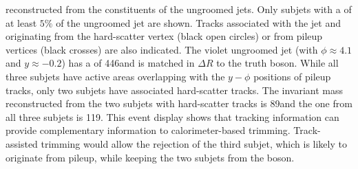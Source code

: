 \documentclass{atlasnote}
\begin{document}
reconstructed from the constituents of the ungroomed jets. Only subjets with a \pT of at least $5\%$ of the ungroomed jet \pT are shown. 
Tracks associated with the jet and originating from the hard-scatter vertex (black open circles) or from pileup vertices (black crosses) 
are also indicated. The violet ungroomed jet (with $\phi \approx 4.1$ and $y \approx -0.2$) has a \pT of 446\GeV and is matched in $\Delta R$ to the truth \Zboson boson. 
While all three subjets have active areas overlapping with the $y-\phi$ positions of pileup tracks, only two subjets have 
associated hard-scatter tracks. 
The invariant mass reconstructed from the two subjets with hard-scatter tracks is 89\GeV and the one from all three subjets is 119\GeV.
This event display shows that tracking information can provide complementary information to calorimeter-based trimming. 
Track-assisted trimming would allow the rejection of the third subjet, which is likely to originate from pileup, while keeping the two subjets from the \Zboson boson. 
\end{document}
